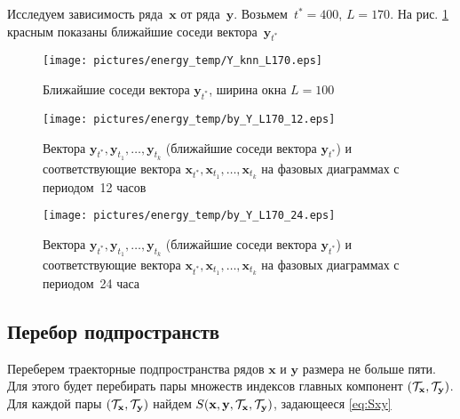 \documentclass[14pt]{article}
\newcommand{\bx}{\mathbf{x}}
\newcommand{\by}{\mathbf{y}}
\begin{document}

Исследуем зависимость ряда~$\bx$ от ряда~$\by$. Возьмем~$t^* = 400$, ${L = 170}$. На рис.  \ref{Y400_L170_knn} красным показаны ближайшие соседи вектора~$\by_{t^*}$

\begin{figure}[H]
\begin{center}
\texttt{[image: pictures/energy\_temp/Y\_knn\_L170.eps]}
\vspace{-4mm}
\caption{Ближайшие соседи вектора $\by_{t^*}$, ширина окна $L = 100$}
\label{Y400_L170_knn}
\end{center}
\end{figure}

\vspace{-5mm}

\begin{figure}[H]
\begin{center}
\texttt{[image: pictures/energy\_temp/by\_Y\_L170\_12.eps]}
\vspace{-4mm}
\caption{Вектора $\by_{t^*}, \by_{t_1}, \ldots, \by_{t_k}$ (ближайшие соседи вектора $\by_{t^*}$) и соответствующие вектора $\bx_{t^*}, \bx_{t_1}, \ldots, \bx_{t_k}$ на фазовых диаграммах с периодом~12 часов}
\end{center}
\end{figure}

\vspace{-3mm}

\begin{figure}[H]
\begin{center}
\texttt{[image: pictures/energy\_temp/by\_Y\_L170\_24.eps]}
\vspace{-4mm}
\caption{Вектора $\by_{t^*}, \by_{t_1}, \ldots, \by_{t_k}$ (ближайшие соседи вектора $\by_{t^*}$) и соответствующие вектора $\bx_{t^*}, \bx_{t_1}, \ldots, \bx_{t_k}$ на фазовых диаграммах с периодом~24 часа}
\end{center}
\end{figure}

 \subsection{Перебор подпространств}
Переберем траекторные подпространства рядов $\bx$ и $\by$ размера не больше пяти. Для этого будет перебирать пары множеств индексов главных компонент $\left(\cT_{\bx}, \cT_{\by}\right)$. Для каждой пары $\left(\cT_{\bx}, \cT_{\by}\right)$ найдем $S(\bx, \by, \cT_{\bx}, \cT_{\by})$, задающееся \eqref{eq:Sxy}
\end{document}
